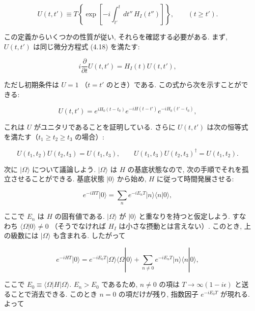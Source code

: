 \documentclass[a4paper,12pt]{article}
\begin{document}
\begin{equation*}
U(t,t') \equiv T \left\{ \exp \left[ -i \int_{t'}^t dt'' \, H_I(t'') \right] \right\},
\qquad (t \geq t'). \tag{4.23}
\end{equation*}

この定義からいくつかの性質が従い, それらを確認する必要がある. まず, $U(t,t')$ は同じ微分方程式 (4.18) を満たす:

\begin{equation*}
i \frac{\partial}{\partial t} U(t,t') = H_I(t) U(t,t'), \tag{4.24}
\end{equation*}

ただし初期条件は $U=1$ （$t=t'$ のとき）である. 
この式から次を示すことができる:

\begin{equation*}
U(t,t') = e^{iH_0(t-t_0)} e^{-iH(t-t')} e^{-iH_0(t'-t_0)}, \tag{4.25}
\end{equation*}

これは $U$ がユニタリであることを証明している. 
さらに $U(t,t')$ は次の恒等式を満たす（$t_1 \geq t_2 \geq t_3$ の場合）:

\begin{equation*}
U(t_1,t_2) U(t_2,t_3) = U(t_1,t_3), 
\qquad U(t_1,t_3) U(t_2,t_3)^\dagger = U(t_1,t_2). \tag{4.26}
\end{equation*}

次に $\lvert \Omega \rangle$ について議論しよう. $\lvert \Omega \rangle$ は $H$ の基底状態なので, 
次の手順でそれを孤立させることができる. 
基底状態 $\lvert 0 \rangle$ から始め, $H$ に従って時間発展させる:

\begin{equation*}
e^{-iHT}\lvert 0 \rangle = \sum_n e^{-iE_n T} \lvert n \rangle \langle n|0\rangle,
\end{equation*}

ここで $E_n$ は $H$ の固有値である. 
$\lvert \Omega \rangle$ が $\lvert 0 \rangle$ と重なりを持つと仮定しよう. 
すなわち $\langle \Omega | 0 \rangle \neq 0$ （そうでなければ $H_I$ は小さな摂動とは言えない）. 
このとき, 上の級数には $\lvert \Omega \rangle$ も含まれる. したがって

\begin{equation*}
e^{-iHT}\lvert 0 \rangle = e^{-iE_0 T}\lvert \Omega \rangle \langle \Omega | 0 \rangle
+ \sum_{n \neq 0} e^{-iE_n T} \lvert n \rangle \langle n | 0 \rangle,
\end{equation*}

ここで $E_0 \equiv \langle \Omega | H | \Omega \rangle$. 
$E_n > E_0$ であるため, $n \neq 0$ の項は $T \to \infty (1-i\epsilon)$ と送ることで消去できる. 
このとき $n=0$ の項だけが残り, 指数因子 $e^{-iE_0 T}$ が現れる. よって
\end{document}
